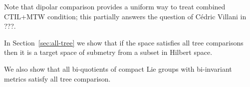 Note that dipolar comparison provides a uniform way to treat combined CTIL+MTW condition;
this partially answers the question of Cédric Villani in ???.

In Section~\ref{sec:all-tree} we show that if the space satisfies all tree comparisons then it is a target space of submetry from a subset in Hilbert space.

We also show that all bi-quotients of compact Lie groups with bi-invariant metrics satisfy all tree comparison.

